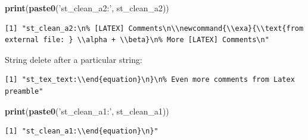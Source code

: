 \documentclass[
]{book}
\newenvironment{Shaded}{\begin{snugshade}}{\end{snugshade}}
\newcommand{\CharTok}[1]{\textcolor[rgb]{0.31,0.60,0.02}{#1}}
\newcommand{\KeywordTok}[1]{\textcolor[rgb]{0.13,0.29,0.53}{\textbf{#1}}}
\newcommand{\NormalTok}[1]{#1}
\newcommand{\StringTok}[1]{\textcolor[rgb]{0.31,0.60,0.02}{#1}}
\begin{document}
\begin{Shaded}
\begin{Highlighting}[]
\KeywordTok{print}\NormalTok{(}\KeywordTok{paste0}\NormalTok{(}\StringTok{'st_clean_a2:'}\NormalTok{, st_clean_a2))}
\end{Highlighting}
\end{Shaded}

\begin{verbatim}
[1] "st_clean_a2:\n% [LATEX] Comments\n\\newcommand{\\exa}{\\text{from external file: } \\alpha + \\beta}\n% More [LATEX] Comments\n"
\end{verbatim}

String delete after a particular string:

\begin{Shaded}
\end{Shaded}

\begin{verbatim}
[1] "st_tex_text:\\end{equation}\n}\n% Even more comments from Latex preamble"
\end{verbatim}

\begin{Shaded}
\begin{Highlighting}[]
\KeywordTok{print}\NormalTok{(}\KeywordTok{paste0}\NormalTok{(}\StringTok{'st_clean_a1:'}\NormalTok{, st_clean_a1))}
\end{Highlighting}
\end{Shaded}

\begin{verbatim}
[1] "st_clean_a1:\\end{equation}\n}"
\end{verbatim}
\end{document}
